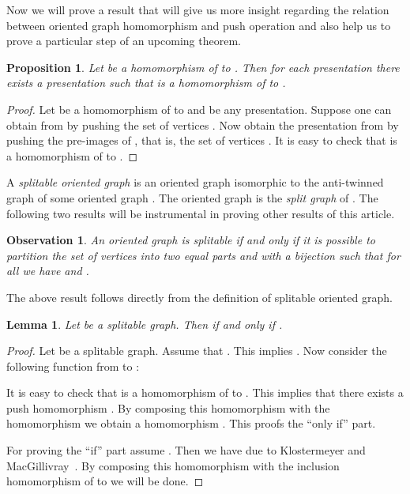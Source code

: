 \documentclass[10pt]{article}
\newtheorem{lemma}[theorem]{Lemma}
\newtheorem{proposition}[theorem]{Proposition}
\newtheorem{observation}[theorem]{Observation}
\begin{document}
\bigskip


Now we will prove a result that will give us more insight regarding the relation between oriented graph homomorphism and push operation and also help us to prove a particular step of an upcoming theorem. 


\begin{proposition}\label{th any target}
Let  be a homomorphism of  to . 
Then for each presentation  there exists a presentation 
 such that  is a homomorphism of 
to .
\end{proposition}

\begin{proof}
Let  be a homomorphism of  to  and  
be any presentation.  Suppose one can obtain  from  by pushing the set of vertices 
. Now obtain the presentation  from  by 
pushing the pre-images of , that is, the set of vertices . It is easy to check that 
 is a homomorphism of 
to .
\end{proof}

















 


A \textit{splitable oriented graph}  is an oriented graph isomorphic  to the anti-twinned graph   of some oriented graph . The oriented graph  is the \textit{split graph} of .
The following two results will be instrumental in proving other results of this article.


\begin{observation}\label{push why splitable}
An oriented graph  is splitable if and only if it is possible to partition the set of vertices   into two equal parts  and  with a bijection  such that 
 for all  we have  and . 
\end{observation}

The above result follows directly from the definition of splitable oriented graph. 

\begin{lemma}\label{lem split implies good}
Let  be a splitable graph. Then  
if and only if . 
\end{lemma}


\begin{proof}
Let  be a splitable graph. 
Assume that . This implies 
. 
Now consider the following function  from  to :



It is easy to check that  is a homomorphism of 
 to . This implies that there exists a 
push homomorphism . By composing this 
homomorphism with the homomorphism 
we obtain a homomorphism . 
This proofs the ``only if'' part.

For proving the  ``if'' part assume . Then 
we have  due to Klostermeyer and MacGillivray~\cite{push}. 
By composing this homomorphism with the inclusion homomorphism of 
 to  we will be done.
\end{proof}
\end{document}
